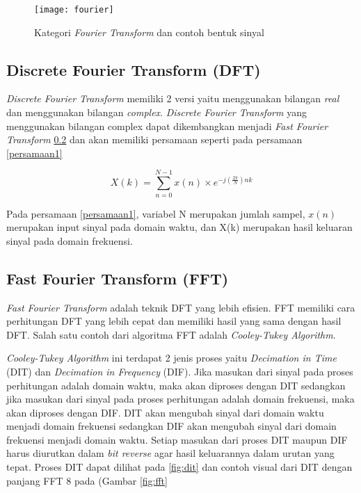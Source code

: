\begin{figure}[H] 
		\centering  
		\texttt{[image: fourier]}  
		\caption[Kategori \textit{Fourier Transform} dan contoh bentuk sinyal]{Kategori \textit{Fourier Transform} dan contoh bentuk sinyal}
		\label{fig:fourier} 
\end{figure}

\subsection{Discrete Fourier Transform (DFT)}
\textit{Discrete Fourier Transform} memiliki 2 versi yaitu menggunakan bilangan \textit{real} dan menggunakan bilangan \textit{complex}. \textit{Discrete Fourier Transform} yang menggunakan bilangan complex dapat dikembangkan menjadi \textit{Fast Fourier Transform} \ref{fft} dan akan memiliki persamaan seperti pada persamaan \ref{persamaan1}

\begin{equation}\label{persamaan1}
X(k)=\sum_{n=0}^{N-1} x(n) \times e^{-j\left(\frac{2 \pi}{N}\right) n k}
\end{equation}

Pada persamaan \ref{persamaan1}, variabel N merupakan jumlah sampel, $x(n)$ merupakan input sinyal pada domain waktu, dan X(k) merupakan hasil keluaran sinyal pada domain frekuensi.

\subsection{Fast Fourier Transform (FFT)}\label{fft}
\textit{Fast Fourier Transform} adalah teknik DFT yang lebih efisien. FFT memiliki cara perhitungan DFT yang lebih cepat dan memiliki hasil yang sama dengan hasil DFT. Salah satu contoh dari algoritma FFT adalah \textit{Cooley-Tukey Algorithm}.

\textit{Cooley-Tukey Algorithm} ini terdapat 2 jenis proses yaitu \textit{Decimation in Time} (DIT) dan \textit{Decimation in Frequency} (DIF). Jika masukan dari sinyal pada proses perhitungan adalah domain waktu, maka akan diproses dengan DIT sedangkan jika masukan dari sinyal pada proses perhitungan adalah domain frekuensi, maka akan diproses dengan DIF. DIT akan mengubah sinyal dari domain waktu menjadi domain frekuensi sedangkan DIF akan mengubah sinyal dari domain frekuensi menjadi domain waktu. Setiap masukan dari proses DIT maupun DIF harus diurutkan dalam \textit{bit reverse} agar hasil keluarannya dalam urutan yang tepat. Proses DIT dapat dilihat pada \ref{fig:dit} dan contoh visual dari DIT dengan panjang FFT 8 pada (Gambar \ref{fig:fft}

